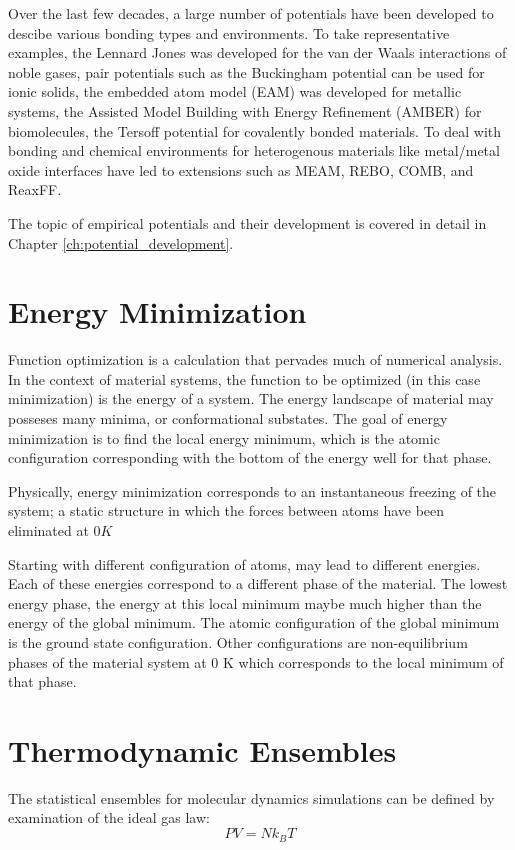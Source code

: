 Over the last few decades, a large number of potentials have been developed to descibe various bonding types and environments.
To take representative examples, the Lennard Jones was developed for the van der Waals interactions of noble gases, pair potentials such as the Buckingham potential can be used for ionic solids, the embedded atom model (EAM) was developed for metallic systems, the Assisted Model Building with Energy Refinement (AMBER) for biomolecules, the Tersoff potential for covalently bonded materials.
To deal with bonding and chemical environments for heterogenous materials like metal/metal oxide interfaces have led to extensions such as MEAM, REBO, COMB, and ReaxFF.

The topic of empirical potentials and their development is covered in detail in Chapter \ref{ch:potential_development}.

\section{Energy Minimization}

Function optimization is a calculation that pervades much of numerical analysis.  In the context of material systems, the function to be optimized (in this case minimization) is the energy of a system.  The energy landscape of material may posseses many minima, or conformational substates.  The goal of energy minimization is to find the local energy minimum, which is the atomic configuration corresponding with the bottom of the energy well for that phase.

Physically, energy minimization corresponds to an instantaneous freezing of the system; a static structure in which the forces between atoms have been eliminated at $0 K$

Starting with different configuration of atoms, may lead to different energies.  Each of these energies correspond to a different phase of the material.  The lowest energy phase, the energy at this local minimum maybe much higher than the energy of the global minimum.  The atomic configuration of the global minimum is the ground state configuration.  Other configurations are non-equilibrium phases of the material system at $0$ K which corresponds to the local minimum of that phase.

\section{Thermodynamic Ensembles}
  The statistical ensembles for molecular dynamics simulations can be defined by examination of the ideal gas law:
  \begin{equation}
  \label{eq:ideal_gas_law}
    PV = N k_B T
  \end{equation}

